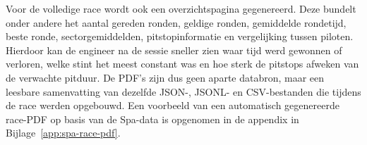Voor de volledige race wordt ook een overzichtspagina gegenereerd. Deze bundelt onder
andere het aantal gereden ronden, geldige ronden, gemiddelde rondetijd, beste ronde,
sectorgemiddelden, pitstopinformatie en vergelijking tussen piloten. Hierdoor kan
de engineer na de sessie sneller zien waar tijd werd gewonnen of verloren, welke stint het meest
constant was en hoe sterk de pitstops afweken van de verwachte pitduur. De PDF's zijn dus geen
aparte databron, maar een leesbare samenvatting van dezelfde JSON-, JSONL- en CSV-bestanden die
tijdens de race werden opgebouwd. Een voorbeeld van een automatisch gegenereerde race-PDF op basis
van de Spa-data is opgenomen in de appendix in Bijlage~\ref{app:spa-race-pdf}.
